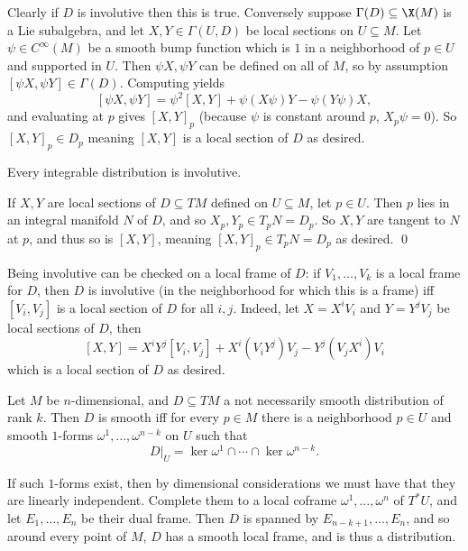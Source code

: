     Clearly if $D$ is involutive then this is true.
    Conversely suppose $\Gamma(D)\subseteq\X(M)$ is a Lie subalgebra, and let $X,Y\in\Gamma(U,D)$ be local sections on $U\subseteq M$.
    Let $\psi\in C^\infty(M)$ be a smooth bump function which is $1$ in a neighborhood of $p\in U$ and supported in $U$.
    Then $\psi X,\psi Y$ can be defined on all of $M$, so by assumption $[\psi X,\psi Y]\in\Gamma(D)$.
    Computing yields
    $$ [\psi X,\psi Y] = \psi^2[X,Y] + \psi(X\psi)Y - \psi(Y\psi)X , $$
    and evaluating at $p$ gives $[X,Y]_p$ (because $\psi$ is constant around $p$, $X_p\psi=0$).
    So $[X,Y]_p\in D_p$ meaning $[X,Y]$ is a local section of $D$ as desired.

\eremark

\bprop

    Every integrable distribution is involutive.

\eprop

\bproof

    If $X,Y$ are local sections of $D\subseteq TM$ defined on $U\subseteq M$, let $p\in U$.
    Then $p$ lies in an integral manifold $N$ of $D$, and so $X_p,Y_p\in T_pN=D_p$.
    So $X,Y$ are tangent to $N$ at $p$, and thus so is $[X,Y]$, meaning $[X,Y]_p\in T_pN=D_p$ as desired.
    \qed

\eproof

Being involutive can be checked on a local frame of $D$: if $V_1,\dots,V_k$ is a local frame for $D$, then $D$ is involutive (in the neighborhood
for which this is a frame) iff $[V_i,V_j]$ is a local section of $D$ for all $i,j$.
Indeed, let $X=X^iV_i$ and $Y=Y^jV_j$ be local sections of $D$, then
$$ [X,Y] = X^iY^j[V_i,V_j] + X^i(V_iY^j)V_j - Y^j(V_jX^i)V_i $$
which is a local section of $D$ as desired.

\blemm

    Let $M$ be $n$-dimensional, and $D\subseteq TM$ a not necessarily smooth distribution of rank $k$.
    Then $D$ is smooth iff for every $p\in M$ there is a neighborhood $p\in U$ and smooth $1$-forms $\omega^1,\dots,\omega^{n-k}$ on $U$ such that
    $$ D|_U = \ker\omega^1\cap\cdots\cap\ker\omega^{n-k} . $$

\elemm

\bproof

    If such $1$-forms exist, then by dimensional considerations we must have that they are linearly independent.
    Complete them to a local coframe $\omega^1,\dots,\omega^n$ of $T^*U$, and let $E_1,\dots,E_n$ be their dual frame.
    Then $D$ is spanned by $E_{n-k+1},\dots,E_n$, and so around every point of $M$, $D$ has a smooth local frame, and is thus a distribution.

